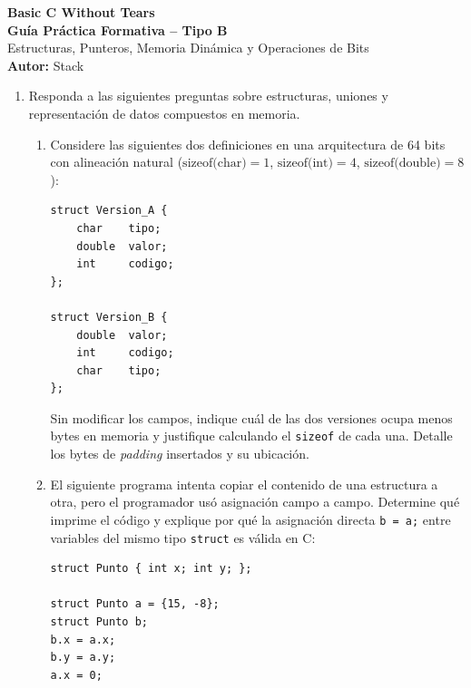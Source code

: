 \documentclass[11pt,letterpaper]{article}
\begin{document}
\begin{center}
    {\LARGE \textbf{Basic C Without Tears}} \\[0.25cm]
    {\Large \textbf{Guía Práctica Formativa -- Tipo B}} \\[0.15cm]
    \small Estructuras, Punteros, Memoria Dinámica y Operaciones de Bits \\[0.1cm]
    \textbf{Autor:} Stack
\end{center}

\vspace{0.4cm}

\begin{enumerate}[label=\textbf{\arabic*.}]

    \item Responda a las siguientes preguntas sobre estructuras, uniones y representación de datos compuestos en memoria.

    \begin{enumerate}[label=(\alph*)]
        \item Considere las siguientes dos definiciones en una arquitectura de 64 bits con alineación natural ($\text{sizeof(char)} = 1$, $\text{sizeof(int)} = 4$, $\text{sizeof(double)} = 8$):
        \begin{lstlisting}[style=customc, numbers=none]
struct Version_A {
    char    tipo;
    double  valor;
    int     codigo;
};

struct Version_B {
    double  valor;
    int     codigo;
    char    tipo;
};
        \end{lstlisting}
        Sin modificar los campos, indique cuál de las dos versiones ocupa menos bytes en memoria y justifique calculando el \texttt{sizeof} de cada una. Detalle los bytes de \textit{padding} insertados y su ubicación.

        \item El siguiente programa intenta copiar el contenido de una estructura a otra, pero el programador usó asignación campo a campo. Determine qué imprime el código y explique por qué la asignación directa \texttt{b = a;} entre variables del mismo tipo \texttt{struct} es válida en C:
        \begin{lstlisting}[style=customc]
struct Punto { int x; int y; };

struct Punto a = {15, -8};
struct Punto b;
b.x = a.x;
b.y = a.y;
a.x = 0;


\end{lstlisting}
\end{enumerate}
\end{enumerate}
\end{document}
